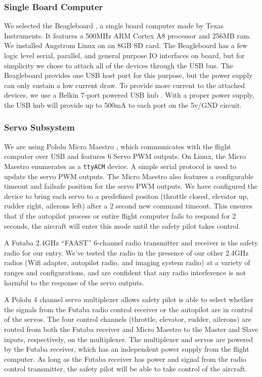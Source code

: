 \documentclass[pdftex,10pt,letter]{article}
\begin{document}
\subsubsection{Single Board Computer}
We selected the Beagleboard \cite{beagleboard}, a single board computer made by Texas Instruments. It features a 500MHz ARM Cortex A8 processor and 256MB ram. We installed Angstrom Linux \cite{angstromlinux} on an 8GB SD card. The Beagleboard has a few logic level serial, parallel, and general purpose IO interfaces on board, but for simplicity we chose to attach all of the devices through the USB bus. The Beagleboard provides one USB host port for this purpose, but the power supply can only sustain a low current draw. To provide more current to the attached devices, we use a Belkin 7-port powered USB hub \cite{belkin7usbhub}. With a proper power supply, the USB hub will provide up to 500mA to each port on the 5v/GND circuit.

\subsubsection{Servo Subsystem}
We are using Pololu Micro Maestro \cite{micromaestro}, which communicates with the flight computer over USB and features 6 Servo PWM outputs. On Linux, the Micro Maestro enumerates as a \texttt{ttyACM} device. A simple serial protocol is used to update the servo PWM outputs. The Micro Maestro also features a configurable timeout and failsafe position for the servo PWM outputs. We have configured the device to bring each servo to a predefined positon (throttle closed, elevator up, rudder right, ailerons left) after a 2 second new command timeout. This ensures that if the autopilot process or entire flight computer fails to respond for 2 seconds, the aircraft will enter this mode until the safety pilot takes control.

A Futaba 2.4GHz ``FAAST'' 6-channel radio transmitter and receiver \cite{futaba24} is the safety radio for our entry. We've tested the radio in the presence of our other 2.4GHz radios (Wifi adapter, autopilot radio, and imaging system radio) at a variety of ranges and configurations, and are confident that any radio interference is not harmful to the response of the servo outputs.

A Pololu 4 channel servo multiplexer \cite{pololumux} allows safety pilot is able to select whether the signals from the Futaba radio control receiver or the autopilot are in control of the servos. The four control channels (throttle, elevator, rudder, ailerons) are routed from both the Futaba receiver and Micro Maestro to the Master and Slave inputs, respectively, on the multiplexer. The multiplexer and servos are powered by the Futaba receiver, which has an independent power supply from the flight computer. As long as the Futaba receiver has power and signal from the radio control transmitter, the safety pilot will be able to take control of the aircraft.
\end{document}
